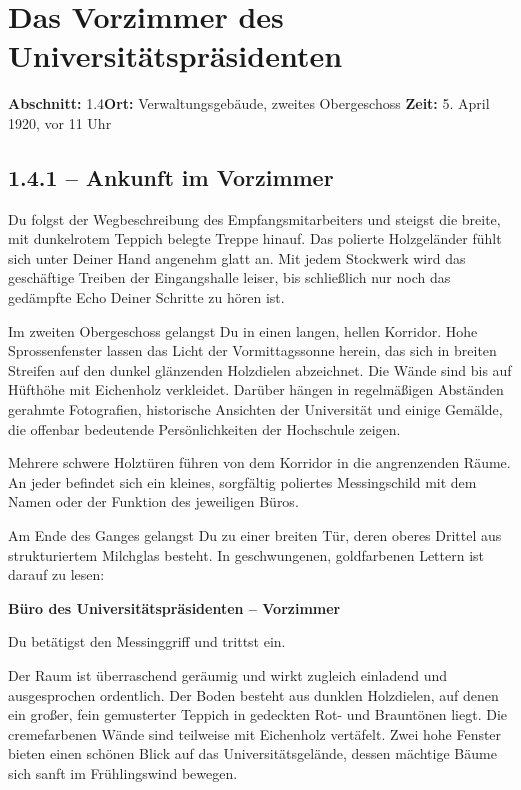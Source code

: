 \clearpage
\section{Das Vorzimmer des Universitätspräsidenten}
\label{sec:vorzimmer}
\noindent\textbf{Abschnitt:} 1.4\quad \textbf{Ort:} Verwaltungsgebäude, zweites Obergeschoss\quad
\textbf{Zeit:} 5. April 1920, vor 11 Uhr

\subsection{1.4.1 -- Ankunft im Vorzimmer}
\begin{vorlesetext}
Du folgst der Wegbeschreibung des Empfangsmitarbeiters und steigst die breite, mit dunkelrotem Teppich belegte Treppe hinauf. Das polierte Holzgeländer fühlt sich unter Deiner Hand angenehm glatt an. Mit jedem Stockwerk wird das geschäftige Treiben der Eingangshalle leiser, bis schlie\ss{}lich nur noch das gedämpfte Echo Deiner Schritte zu hören ist.

Im zweiten Obergeschoss gelangst Du in einen langen, hellen Korridor. Hohe Sprossenfenster lassen das Licht der Vormittagssonne herein, das sich in breiten Streifen auf den dunkel glänzenden Holzdielen abzeichnet. Die Wände sind bis auf Hüfthöhe mit Eichenholz verkleidet. Darüber hängen in regelmä\ss{}igen Abständen gerahmte Fotografien, historische Ansichten der Universität und einige Gemälde, die offenbar bedeutende Persönlichkeiten der Hochschule zeigen.

Mehrere schwere Holztüren führen von dem Korridor in die angrenzenden Räume. An jeder befindet sich ein kleines, sorgfältig poliertes Messingschild mit dem Namen oder der Funktion des jeweiligen Büros.

Am Ende des Ganges gelangst Du zu einer breiten Tür, deren oberes Drittel aus strukturiertem Milchglas besteht. In geschwungenen, goldfarbenen Lettern ist darauf zu lesen:

\begin{center}\textbf{Büro des Universitätspräsidenten -- Vorzimmer}\end{center}

Du betätigst den Messinggriff und trittst ein.

Der Raum ist überraschend geräumig und wirkt zugleich einladend und ausgesprochen ordentlich. Der Boden besteht aus dunklen Holzdielen, auf denen ein gro\ss{}er, fein gemusterter Teppich in gedeckten Rot- und Brauntönen liegt. Die cremefarbenen Wände sind teilweise mit Eichenholz vertäfelt. Zwei hohe Fenster bieten einen schönen Blick auf das Universitätsgelände, dessen mächtige Bäume sich sanft im Frühlingswind bewegen.


\end{vorlesetext}
